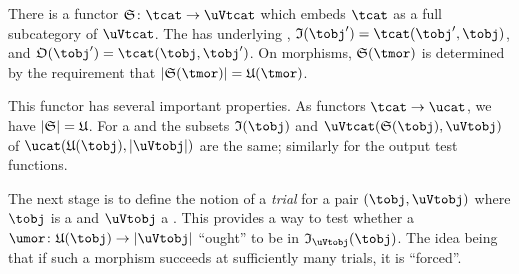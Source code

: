 \documentclass[%
a4paper,%
arxiv,%
defaults
]{myclass}
\begin{document}
\begin{lemma}
\label{lem:tembed}
There is a functor \(\sfunc \colon \tcat \to \uVtcat\) which embeds \(\tcat\) as a full subcategory of \(\uVtcat\).
The \uVtobj[\sfunc(\tobj)] has underlying \uobj[\ufunc(\tobj)],  \itest \(\itest(\tobj') = \Hom{\tcat}{\tobj'}{\tobj}\), and \otest \(\otest(\tobj') = \Hom{\tcat}{\tobj}{\tobj'}\).
On morphisms, \(\sfunc(\tmor)\) is determined by the requirement that \(\forfunc[\sfunc(\tmor)] = \ufunc(\tmor)\).

This functor has several important properties.
As functors \(\tcat \to \ucat\), we have \(\forfunc[\sfunc] = \ufunc\).
For a \uVtobj[\uVtobj] and \tobj[\tobj] the subsets \(\itest(\tobj)\) and \(\Hom{\uVtcat}{\sfunc(\tobj)}{\uVtobj}\) of \(\Hom{\ucat}{\ufunc(\tobj)}{\abs{\uVtobj}}\) are the same; similarly for the output test functions.
\noproof
\end{lemma}

The next stage is to define the notion of a \emph{trial} for a pair \((\tobj,\uVtobj)\) where \(\tobj\) is a \tobj and \(\uVtobj\) a \uVtobj.
This provides a way to test whether a \umor  \(\umor \colon \ufunc(\tobj) \to \abs{\uVtobj}\) ``ought'' to be in \(\itest_{\uVtobj}(\tobj)\).
The idea being that if such a morphism succeeds at sufficiently many trials, it is ``forced''.
\end{document}
